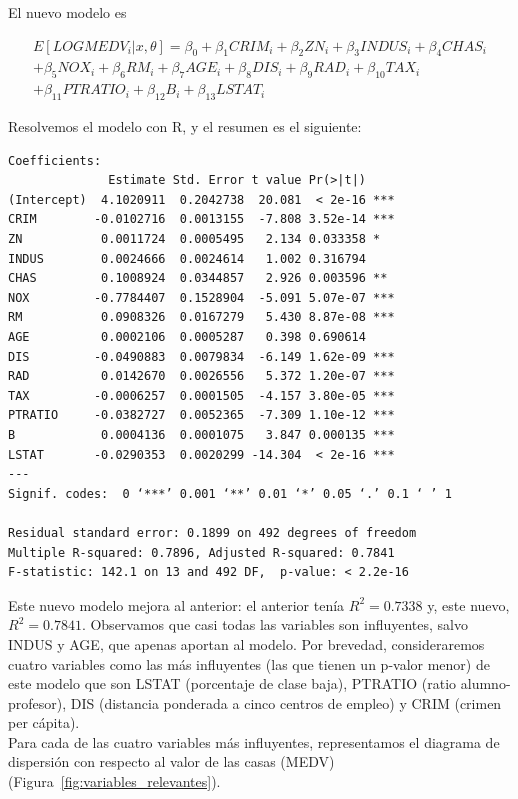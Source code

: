 \documentclass[12pt,a4paper,twoside,openright,titlepage,final]{article}
\begin{document}
El nuevo modelo es

\begin{multline*}
E[LOGMEDV_i |x, \theta] = \beta_0 + \beta_1 CRIM_i + \beta_2 ZN_i + \beta_3 INDUS_i + \beta_4 CHAS_i \\ + \beta_5 NOX_i + \beta_6 RM_i + \beta_7 AGE_i + \beta_8 DIS_i + \beta_9 RAD_i + \beta_{10} TAX_i \\ +  \beta_{11} PTRATIO_i + \beta_{12} B_i + \beta_{13} LSTAT_i
\end{multline*}

Resolvemos el modelo con R, y el resumen es el siguiente:

\begin{verbatim}
Coefficients:
              Estimate Std. Error t value Pr(>|t|)    
(Intercept)  4.1020911  0.2042738  20.081  < 2e-16 ***
CRIM        -0.0102716  0.0013155  -7.808 3.52e-14 ***
ZN           0.0011724  0.0005495   2.134 0.033358 *  
INDUS        0.0024666  0.0024614   1.002 0.316794    
CHAS         0.1008924  0.0344857   2.926 0.003596 ** 
NOX         -0.7784407  0.1528904  -5.091 5.07e-07 ***
RM           0.0908326  0.0167279   5.430 8.87e-08 ***
AGE          0.0002106  0.0005287   0.398 0.690614    
DIS         -0.0490883  0.0079834  -6.149 1.62e-09 ***
RAD          0.0142670  0.0026556   5.372 1.20e-07 ***
TAX         -0.0006257  0.0001505  -4.157 3.80e-05 ***
PTRATIO     -0.0382727  0.0052365  -7.309 1.10e-12 ***
B            0.0004136  0.0001075   3.847 0.000135 ***
LSTAT       -0.0290353  0.0020299 -14.304  < 2e-16 ***
---
Signif. codes:  0 ‘***’ 0.001 ‘**’ 0.01 ‘*’ 0.05 ‘.’ 0.1 ‘ ’ 1 

Residual standard error: 0.1899 on 492 degrees of freedom
Multiple R-squared: 0.7896,	Adjusted R-squared: 0.7841 
F-statistic: 142.1 on 13 and 492 DF,  p-value: < 2.2e-16 
\end{verbatim}

Este nuevo modelo mejora al anterior: el anterior tenía $R^2 = 0.7338$ y, este nuevo, $R^2 = 0.7841$. Observamos que casi todas las variables son influyentes, salvo INDUS y AGE, que apenas aportan al modelo. Por brevedad, consideraremos cuatro variables como las más influyentes (las que tienen un p-valor menor) de este modelo que son LSTAT (porcentaje de clase baja), PTRATIO (ratio alumno-profesor), DIS (distancia ponderada a cinco centros de empleo) y CRIM (crimen per cápita).\\

Para cada de las cuatro variables más influyentes, representamos el diagrama de dispersión con respecto al valor de las casas (MEDV)(Figura~\ref{fig:variables_relevantes}).
\end{document}
